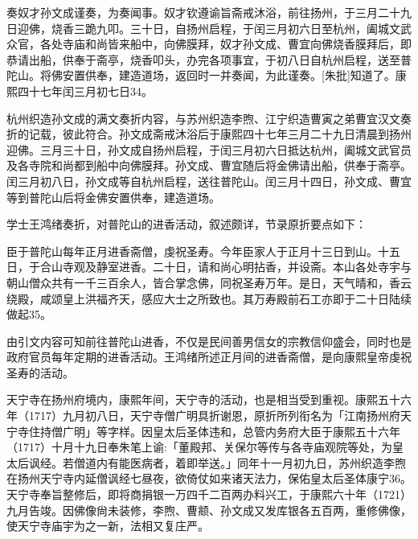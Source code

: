 奏奴才孙文成谨奏，为奏闻事。奴才钦遵谕旨斋戒沐浴，前往扬州，于三月二十九日迎佛，烧香三跪九叩。三十日，自扬州启程，于闰三月初六日至杭州，阖城文武众官，各处寺庙和尚皆来船中，向佛膜拜，奴才孙文成、曹宜向佛烧香膜拜后，即恭请出船，供奉于斋亭，烧香叩头，办完各项事宜，于初八日自杭州启程，送至普陀山。将佛安置供奉，建造道场，返回时一并奏闻，为此谨奏。[朱批]知道了。康熙四十七年闰三月初七日34。

\vfill
\begin{BookNotes}
\end{BookNotes}

杭州织造孙文成的满文奏折内容，与苏州织造李煦、江宁织造曹寅之弟曹宜汉文奏折的记载，彼此符合。孙文成斋戒沐浴后于康熙四十七年三月二十九日清晨到扬州迎佛。三月三十日，孙文成自扬州启程，于闰三月初六日抵达杭州，阖城文武官员及各寺院和尚都到船中向佛膜拜。孙文成、曹宜随后将金佛请出船，供奉于斋亭。闰三月初八日，孙文成等自杭州启程，送往普陀山。闰三月十四日，孙文成、曹宜等到普陀山后将金佛安置供奉，建造道场。

学士王鸿绪奏折，对普陀山的进香活动，叙述颇详，节录原折要点如下：

\begin{BookQuote}
臣于普陀山每年正月进香斋僧，虔祝圣寿。今年臣家人于正月十三日到山。十五日，于合山寺观及静室进香。二十日，请和尚心明拈香，并设斋。本山各处寺宇与朝山僧众共有一千三百余人，皆合掌念佛，同祝圣寿万年。是日，天气晴和，香云绕殿，咸颂皇上洪福齐天，感应大士之所致也。其万寿殿前石工亦即于二十日陆续做起35。
\end{BookQuote}

由引文内容可知前往普陀山进香，不仅是民间善男信女的宗教信仰盛会，同时也是政府官员每年定期的进香活动。王鸿绪所述正月间的进香斋僧，是向康熙皇帝虔祝圣寿的活动。

天宁寺在扬州府境内，康熙年间，天宁寺的活动，也是相当受到重视。康熙五十六年（1717）九月初八日，天宁寺僧广明具折谢恩，原折所列衔名为「江南扬州府天宁寺住持僧广明」等字样。因皇太后圣体违和，总管内务府大臣于康熙五十六年（1717）十月十九日奉朱笔上谕:「董殿邦、关保尔等传与各寺庙观院等处，为皇太后讽经。若僧道内有能医病者，着即举送。」同年十一月初九日，苏州织造李煦在扬州天宁寺内延僧讽经七昼夜，欲倚仗如来诸天法力，保佑皇太后圣体康宁36。天宁寺奉旨整修后，即将商捐银一万四千二百两办料兴工，于康熙六十年（1721）九月告竣。因佛像尙未装修，李煦、曹𫖯、孙文成又发库银各五百两，重修佛像，使天宁寺庙宇为之一新，法相又复庄严。


